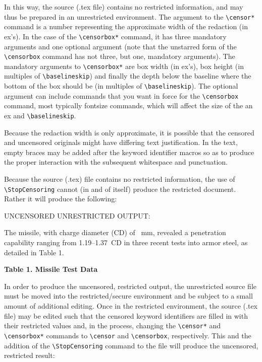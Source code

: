 \documentclass{article}
\begin{document}
In this way, the source (.tex file) contains no restricted information,
and may thus be prepared in an unrestricted environment.  The argument
to the \verb|\censor*| command is a number representing the approximate
width of the redaction (in ex's).  In the case of the \verb|\censorbox*|
command, it has three mandatory arguments and one optional argument
(note that the unstarred form of the \verb|\censorbox| command has not
three, but one, mandatory arguments).  The mandatory arguments to
\verb|\censorbox*| are box width (in ex's), box height (in multiples of
\verb|\baselineskip|) and finally the depth below the baseline where the
bottom of the box should be (in multiples of \verb|\baselineskip|).  The
optional argument can include commands that you want in force for the
\verb|\censorbox| command, most typically fontsize commands, which will
affect the size of the an ex and \verb|\baselineskip|.

Because the redaction width is only approximate, it is possible that the
  censored and uncensored originals might have differing text
  justification.  
In the text, empty braces may be added after the
  keyword identifier macros so as to produce the proper interaction 
  with the subsequent whitespace and punctuation.

Because the source (.tex) file contains no restricted information, the
use of \verb|\StopCensoring| cannot (in and of itself) produce the
restricted document.  Rather it will produce the following:

{\addtolength{\leftskip}{2.3em}
UNCENSORED UNRESTRICTED OUTPUT: \hrulefill

\StopCensoring

\def\Missile{\censor*{7}}
\def\Size{\censor*{2}}
\def\TableOne{\censorbox*[\small]{26}{5}{3.5}}

The {\Missile} missile, with charge diameter (CD) of {\Size}~mm, revealed a
penetration capability ranging from 1.19--1.37~CD in three recent tests
into armor steel, as detailed in Table 1.

\begin{table}[ht]
\begin{center}
\textbf{Table 1. {\Missile} Missile Test Data}\\
{\TableOne}
\end{center}
\end{table}

\hrulefill

}

In order to produce the uncensored, restricted output, the unrestricted
source file must be moved into the restricted/secure environment and be
subject to a small amount of additional editing.  Once in the restricted
environment, the source (.tex file) may be edited such that the censored
keyword identifiers are filled in with their restricted values and, in
the process, changing the \verb|\censor*| and \verb|\censorbox*|
commands to \verb|\censor| and \verb|\censorbox|, respectively.  This
and the addition of the \verb|\StopCensoring| command to the file will
produce the uncensored, restricted result:
\end{document}
